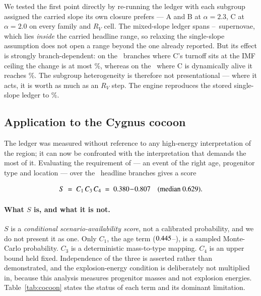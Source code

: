 \documentclass{aa}
\begin{document}
We tested the first point directly by re-running the ledger with each subgroup
assigned the carried slope its own closure prefers --- A and B at $\alpha=2.3$,
C at $\alpha=2.0$ on every family and $R_V$ cell. The mixed-slope ledger spans
\mixedLo--\mixedHi\ supernovae, which lies \emph{inside} the carried headline
range, so relaxing the single-slope assumption does not open a range beyond the
one already reported. But its effect is strongly branch-dependent: on the
\mixedDeadBranches\ branches where C's turnoff sits at the IMF ceiling the
change is at most \mixedShiftDead\%, whereas on the \mixedAliveBranches\ where C
is dynamically alive it reaches \mixedShift\%. The subgroup heterogeneity is
therefore not presentational --- where it acts, it is worth as much as an $R_V$
step. The engine reproduces the stored single-slope ledger to \mixedCheck\%.

\subsection{Application to the Cygnus cocoon}\label{sec:cocoon}

The ledger was measured without reference to any high-energy interpretation of
the region; it can now be confronted with the interpretation that demands the
most of it. Evaluating the requirement of \citet{harer2025} --- an event of the
right age, progenitor type and location --- over the \Pverdictbranches\ headline
branches gives a score

\begin{equation}
S \;=\; C_1 \, C_3 \, C_4 \;=\; 0.380\!-\!0.807
\quad (\text{median } 0.629).
\end{equation}

\paragraph{What $S$ is, and what it is not.}
$S$ is a \emph{conditional scenario-availability score}, not a calibrated
probability, and we do not present it as one. Only $C_1$, the age term
($0.445$--\Conehi), is a sampled Monte-Carlo probability. $C_3$ is a
deterministic mass-to-type mapping. $C_4$ is an upper bound held fixed.
Independence of the three is asserted rather than demonstrated, and the
explosion-energy condition is deliberately not multiplied in, because this
analysis measures progenitor masses and not explosion energies.
Table~\ref{tab:cocoon} states the status of each term and its dominant
limitation.
\end{document}
